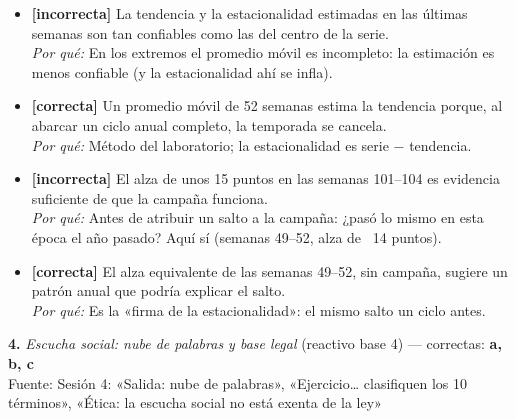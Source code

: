 \documentclass[10pt,letterpaper]{article}
\begin{document}
\begin{itemize}[leftmargin=1.2em,itemsep=0pt,topsep=1pt,parsep=0pt]
\item[\textbf{a)}] {\footnotesize \textbf{[incorrecta]} La tendencia y la estacionalidad estimadas en las últimas semanas son tan confiables como las del centro de la serie.\\ \textit{Por qué:} En los extremos el promedio móvil es incompleto: la estimación es menos confiable (y la estacionalidad ahí se infla).}
\item[\textbf{b)}] {\footnotesize \textbf{[correcta]} Un promedio móvil de 52 semanas estima la tendencia porque, al abarcar un ciclo anual completo, la temporada se cancela.\\ \textit{Por qué:} Método del laboratorio; la estacionalidad es serie $-$ tendencia.}
\item[\textbf{c)}] {\footnotesize \textbf{[incorrecta]} El alza de unos 15 puntos en las semanas 101--104 es evidencia suficiente de que la campaña funciona.\\ \textit{Por qué:} Antes de atribuir un salto a la campaña: ¿pasó lo mismo en esta época el año pasado? Aquí sí (semanas 49--52, alza de ~14 puntos).}
\item[\textbf{d)}] {\footnotesize \textbf{[correcta]} El alza equivalente de las semanas 49--52, sin campaña, sugiere un patrón anual que podría explicar el salto.\\ \textit{Por qué:} Es la «firma de la estacionalidad»: el mismo salto un ciclo antes.}
\end{itemize}
\vspace{3pt}\noindent\textbf{4.} \textit{Escucha social: nube de palabras y base legal} (reactivo base 4) — correctas: \textbf{a, b, c}\\[-1pt]
{\scriptsize Fuente: Sesión 4: «Salida: nube de palabras», «Ejercicio… clasifiquen los 10 términos», «Ética: la escucha social no está exenta de la ley»}
\end{document}
